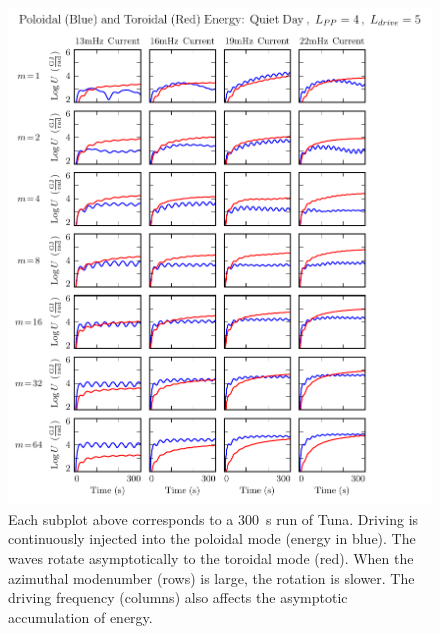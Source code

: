 \begin{figure}[!htb]
    \centering
    \includegraphics[width=\textwidth]{figures/U_2_4_5.pdf}
    \caption[Poloidal and Toroidal Energy: Quiet Day, Typical Plasmasphere]{
      Each subplot above corresponds to a \SI{300}{\s} run of Tuna. Driving is continuously injected into the poloidal mode (energy in blue). The waves rotate asymptotically to the toroidal mode (red). When the azimuthal modenumber (rows) is large, the rotation is slower. The driving frequency (columns) also affects the asymptotic accumulation of energy. 
    }
    \label{fig_U_2_4_5}
\end{figure}

